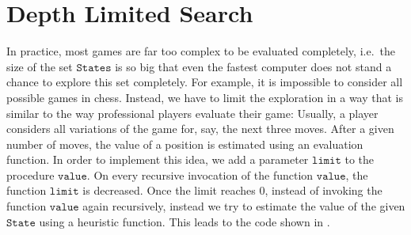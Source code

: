 \section{Depth Limited Search}
In practice, most games are far too complex to be evaluated completely, i.e.~the size of the set
$\mathtt{States}$ is so big that even the fastest computer does not stand a chance to explore this set
completely.  For example, it is impossible to consider all possible games in chess.  Instead, we have to limit
the exploration in a way that is similar to the way professional players evaluate their game:  Usually, a
player considers all variations of the game for, say, the next three moves.  After a given number of moves, the
value of a position is estimated using an evaluation function.  In order to implement this idea, we add a
parameter $\mathtt{limit}$ to the procedure $\mathtt{value}$.  On every recursive invocation 
of the function $\mathtt{value}$, the function $\mathtt{limit}$ is decreased.  Once the limit reaches $0$,
instead of invoking the function $\mathtt{value}$ again recursively, instead we try to estimate the value of
the given $\mathtt{State}$ using a heuristic function.  This leads to the code shown in .


